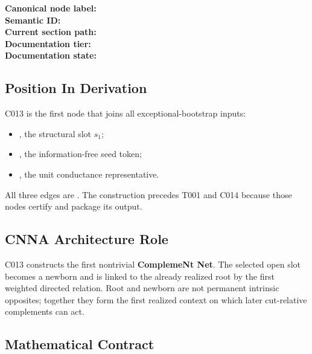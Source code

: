 \textbf{Canonical node label:} \texttt{\protect{}}\\
\textbf{Semantic ID:} \texttt{\protect{}}\\
\textbf{Current section path:} \texttt{\protect{}}\\
\textbf{Documentation tier:} \texttt{\protect{}}\\
\textbf{Documentation state:} \texttt{\protect{}}

\subsection{Position In Derivation}\label{position-in-derivation-7}

C013 is the first node that joins all exceptional-bootstrap inputs:

\begin{itemize}
\tightlist
\item
  \texttt{\protect{}}, the structural slot
  \(s_1\);
\item
  \texttt{\protect{}}, the information-free seed
  token;
\item
  \texttt{\protect{}}, the unit conductance
  representative.
\end{itemize}

All three edges are \texttt{\protect{}}. The construction precedes
T001 and C014 because those nodes certify and package its output.

\subsection{CNNA Architecture Role}\label{cnna-architecture-role-4}

C013 constructs the first nontrivial \textbf{ComplemeNt Net}. The
selected open slot becomes a newborn and is linked to the already
realized root by the first weighted directed relation. Root and newborn
are not permanent intrinsic opposites; together they form the first
realized context on which later cut-relative complements can act.

\subsection{Mathematical Contract}\label{mathematical-contract-3}

